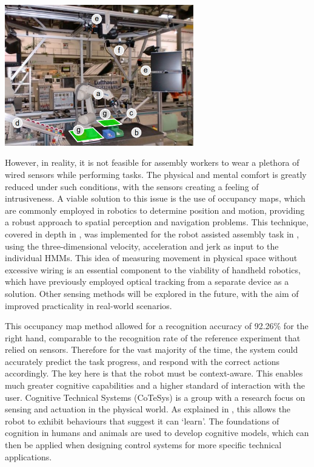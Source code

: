 \documentclass[11pt]{article}
\begin{document}
\begin{center}
\includegraphics[width = 0.62\textwidth]{jahir.png}
\label{figure:jahir}
\end{center}

However, in reality, it is not feasible for assembly workers to wear a plethora of wired sensors while performing tasks. The physical and mental comfort is greatly reduced under such conditions, with the sensors creating a feeling of intrusiveness. A viable solution to this issue is the use of occupancy maps, which are commonly employed in robotics to determine position and motion, providing a robust approach to spatial perception and navigation problems. This technique, covered in depth in \cite{elfes1989}, was implemented for the robot assisted assembly task in \cite{lenz2011}, using the three-dimensional velocity, acceleration and jerk as input to the individual HMMs. This idea of measuring movement in physical space without excessive wiring is an essential component to the viability of handheld robotics, which have previously employed optical tracking from a separate device as a solution. Other sensing methods will be explored in the future, with the aim of improved practicality in real-world scenarios.

This occupancy map method allowed for a recognition accuracy of 92.26\% for the right hand, comparable to the recognition rate of the reference experiment that relied on sensors. Therefore for the vast majority of the time, the system could accurately predict the task progress, and respond with the correct actions accordingly. The key here is that the robot must be context-aware. This enables much greater cognitive capabilities and a higher standard of interaction with the user. Cognitive Technical Systems (CoTeSys) is a group with a research focus on sensing and actuation in the physical world. As explained in \cite{buss2010}, this allows the robot to exhibit behaviours that suggest it can `learn'. The foundations of cognition in humans and animals are used to develop cognitive models, which can then be applied when designing control systems for more specific technical applications. 
\end{document}
